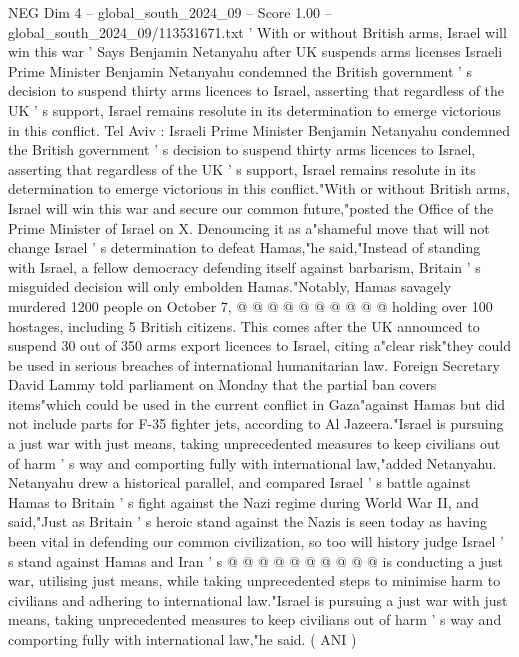 \begin{textsample}{NEG Dim 4 – global\_south\_2024\_09 – Score 1.00 – global\_south\_2024\_09/113531671.txt}  \label{ex:f4_neg_190}
' With or without British arms, Israel will win this war ' Says Benjamin Netanyahu after UK suspends arms licenses Israeli Prime Minister Benjamin Netanyahu condemned the British government ' s decision to suspend thirty arms licences to Israel, asserting that regardless of the UK ' s support, Israel remains resolute in its determination to emerge victorious in this conflict.
Tel Aviv : Israeli Prime Minister Benjamin Netanyahu condemned the British government ' s decision to suspend thirty arms licences to Israel, asserting that regardless of the UK ' s support, Israel remains resolute in its determination to emerge victorious in this conflict."With or without British arms, Israel will win this war and secure our common future,"posted the Office of the Prime Minister of Israel on X.
Denouncing it as a"shameful move that will not change Israel ' s determination to defeat Hamas,"he said,"Instead of standing with Israel, a fellow democracy defending itself against barbarism, Britain ' s misguided decision will only embolden Hamas."Notably, Hamas savagely murdered 1200 people on October 7, @ @ @ @ @ @ @ @ @ @ holding over 100 hostages, including 5 British citizens.
This comes after the UK announced to suspend 30 out of 350 arms export licences to Israel, citing a"clear risk"they could be used in serious breaches of international humanitarian law.
Foreign Secretary David Lammy told parliament on Monday that the partial ban covers items"which could be used in the current conflict in Gaza"against Hamas but did not include parts for F-35 fighter jets, according to Al Jazeera."Israel is pursuing a just war with just means, taking unprecedented measures to keep civilians out of harm ' s way and comporting fully with international law,"added Netanyahu.
Netanyahu drew a historical parallel, and compared Israel ' s battle against Hamas to Britain ' s fight against the Nazi regime during World War II, and said,"Just as Britain ' s heroic stand against the Nazis is seen today as having been vital in defending our common civilization, so too will history judge Israel ' s stand against Hamas and Iran ' s @ @ @ @ @ @ @ @ @ @ is conducting a just war, utilising just means, while taking unprecedented steps to minimise harm to civilians and adhering to international law."Israel is pursuing a just war with just means, taking unprecedented measures to keep civilians out of harm ' s way and comporting fully with international law,"he said. ( ANI )

\end{textsample}

